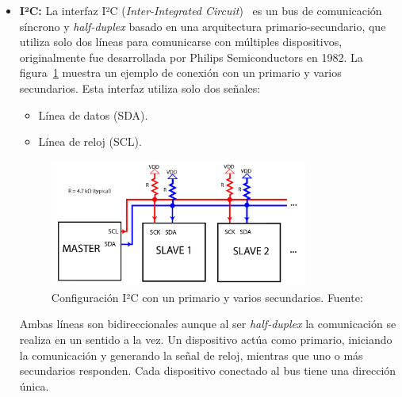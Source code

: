 \begin{itemize}
    primario y secundario pueden enviar y recibir datos simultáneamente.
    Esta interfaz tiene un solo primario y puede tener uno o múltiples secundarios.
    En configuraciones con múltiples secundarios se pueden conectar de dos modos:
    \begin{itemize}
        \item \textbf{Modo regular:} Cada nodo tiene su propia línea de CS.
        \item \textbf{Modo cadena (\emph{daisy-chain}):} Todos los nodos comparten el mismo reloj y CS y los datos se propagan de un secundario al siguiente.
        De esta manera se reduce el número de GPIO necesarios en el primario, aunque aumenta el número de ciclos de reloj requeridos para llegar a cada secundario.
    \end{itemize}
    La velocidad de transferencia puede variar dependiendo del hardware utilizado, lo habitual es entre 1 y 10Mbps, aunque algunos dispositivos permiten velocidades superiores.

    \item \textbf{I²C:} La interfaz I²C (\emph{Inter-Integrated Circuit})~\cite{i2c_specification} es un bus de comunicación síncrono y \emph{half-duplex} basado en una arquitectura primario-secundario, que utiliza solo dos líneas para comunicarse con múltiples dispositivos,
    originalmente fue desarrollada por Philips Semiconductors en 1982. La figura~\ref{fig:i2c} muestra un ejemplo de conexión con un primario y varios secundarios.
    Esta interfaz utiliza solo dos señales:
    \begin{itemize}
        \item Línea de datos (SDA).
        \item Línea de reloj (SCL).
    \end{itemize}
    \begin{figure}[h]
        \centering
        \includegraphics[width=0.8\textwidth]{Imagenes/Bitmap/i2c}
        \caption{Configuración I²C con un primario y varios secundarios. Fuente: \cite{teachmemicro_i2c2018}}
        \label{fig:i2c}
    \end{figure}
    Ambas líneas son bidireccionales aunque al ser \emph{half-duplex} la comunicación se realiza en un sentido a la vez.
    Un dispositivo actúa como primario, iniciando la comunicación y generando la señal de reloj, mientras que uno o más secundarios responden.
    Cada dispositivo conectado al bus tiene una dirección única.


\end{itemize}
